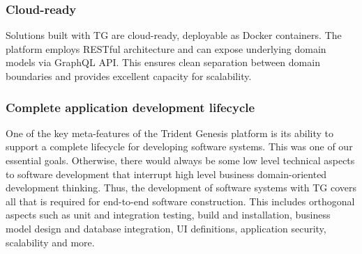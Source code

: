 \documentclass[a4paper,10pt,twocolumn,oneside,openright,final]{memoir}
\begin{document}
\subsubsection*{Cloud-ready}
	Solutions built with TG are cloud-ready, deployable as Docker containers.
	The platform employs RESTful architecture and can expose underlying domain models via GraphQL API.
	This ensures clean separation between domain boundaries and provides excellent capacity for scalability.

\subsubsection*{Complete application development lifecycle}
	One of the key meta-features of the Trident Genesis platform is its ability to support a complete lifecycle for developing software systems.
	This was one of our essential goals.
	Otherwise, there would always be some low level technical aspects to software development that interrupt high level business domain-oriented development thinking.
	Thus, the development of software systems with TG covers all that is required for end-to-end software construction.
	This includes orthogonal aspects such as unit and integration testing, build and installation, business model design and database integration, UI definitions, application security, scalability and more.
\end{document}
